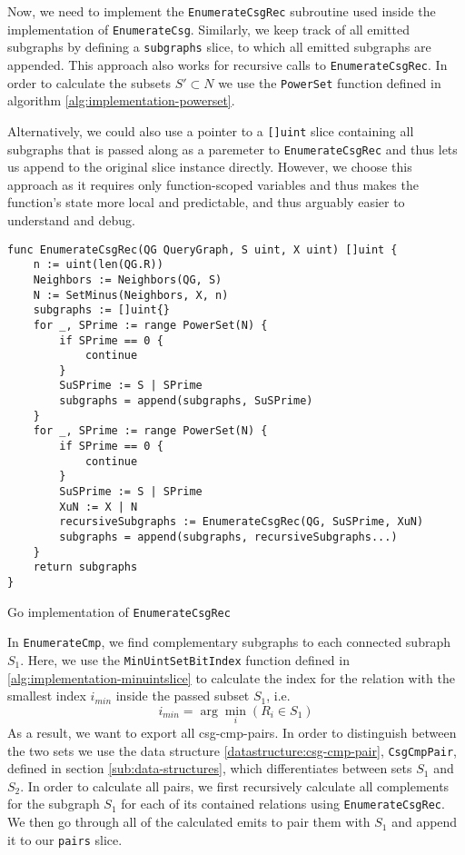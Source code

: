Now, we need to implement the \texttt{EnumerateCsgRec} subroutine used inside the implementation of \texttt{EnumerateCsg}. Similarly, we keep track of all emitted subgraphs by defining a \texttt{subgraphs} slice, to which all emitted subgraphs are appended. This approach also works for recursive calls to \texttt{EnumerateCsgRec}. In order to calculate the subsets $S' \subset N$ we use the \texttt{PowerSet} function defined in algorithm \ref{alg:implementation-powerset}.

\begin{note}
Alternatively, we could also use a pointer to a \texttt{[]uint} slice containing all subgraphs that is passed along as a paremeter to \texttt{EnumerateCsgRec} and thus lets us append to the original slice instance directly. However, we choose this approach as it requires only function-scoped variables and thus makes the function's state more local and predictable, and thus arguably easier to understand and debug.
\end{note}

\vspace{0.4cm}
\begin{algorithm}[H]
\begin{verbatim}
func EnumerateCsgRec(QG QueryGraph, S uint, X uint) []uint {
    n := uint(len(QG.R))
    Neighbors := Neighbors(QG, S)
    N := SetMinus(Neighbors, X, n)
    subgraphs := []uint{}
    for _, SPrime := range PowerSet(N) {
        if SPrime == 0 {
            continue
        }
        SuSPrime := S | SPrime
        subgraphs = append(subgraphs, SuSPrime)
    }
    for _, SPrime := range PowerSet(N) {
        if SPrime == 0 {
            continue
        }
        SuSPrime := S | SPrime
        XuN := X | N
        recursiveSubgraphs := EnumerateCsgRec(QG, SuSPrime, XuN)
        subgraphs = append(subgraphs, recursiveSubgraphs...)
    }
    return subgraphs
}
\end{verbatim}
\caption{Go implementation of \texttt{EnumerateCsgRec}}
\label{alg:enumeratecsgrec}
\end{algorithm}

In \texttt{EnumerateCmp}, we find complementary subgraphs to each connected subraph $S_1$.
Here, we use the \texttt{MinUintSetBitIndex} function defined in \ref{alg:implementation-minuintslice} to calculate the index for the relation with the smallest index $i_{min}$ inside the passed subset $S_1$, i.e.
\begin{equation}
i_{min} = \arg\min_i(R_i \in S_1)
\end{equation}
As a result, we want to export all csg-cmp-pairs. In order to distinguish between the two sets we use the data structure \ref{datastructure:csg-cmp-pair}, \texttt{CsgCmpPair}, defined in section \ref{sub:data-structures}, which differentiates between sets $S_1$ and $S_2$. In order to calculate all pairs, we first recursively calculate all complements for the subgraph $S_1$ for each of its contained relations using \texttt{EnumerateCsgRec}. We then go through all of the calculated emits to pair them with $S_1$ and append it to our \texttt{pairs} slice.

